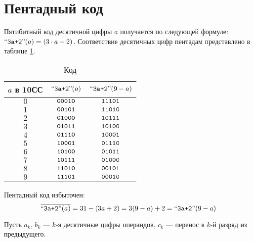 \section{Пентадный код \PentaLabel}

Пятибитный код десятичной цифры $a$ получается по следующей формуле: $\text{``\texttt{3a+2}''}(a)=(3\cdot a + 2)$. Соответствие десятичных цифр пентадам представлено в таблице \ref{t:bcd:Penta}. 
    
\begin{table}[!ht]
    \caption{Код \PentaLabel}
    \label{t:bcd:Penta}
    \centering
    \begin{tabular}{|c|c|c|}
        \hline\hline
        $a$ в 10СС  & $\text{``\texttt{3a+2}''}(a)$       & $\text{``\texttt{3a+2}''}(9-a)$\\
        \hline\hline
        $0$         & $\texttt{00010}$  & $\texttt{11101}$ \\
        $1$         & $\texttt{00101}$  & $\texttt{11010}$ \\
        $2$         & $\texttt{01000}$  & $\texttt{10111}$ \\
        $3$         & $\texttt{01011}$  & $\texttt{10100}$ \\
        $4$         & $\texttt{01110}$  & $\texttt{10001}$ \\
        $5$         & $\texttt{10001}$  & $\texttt{01110}$ \\
        $6$         & $\texttt{10100}$  & $\texttt{01011}$ \\
        $7$         & $\texttt{10111}$  & $\texttt{01000}$ \\
        $8$         & $\texttt{11010}$  & $\texttt{00101}$ \\
        $9$         & $\texttt{11101}$  & $\texttt{00010}$ \\
        \hline
    \end{tabular}
\end{table}

Пентадный код избыточен:    
\[
    \overline{\text{``\texttt{3a+2}''}(a)}=31-(3a+2)=3(9-a)+2=\text{``\texttt{3a+2}''}(9-a)
\]

Пусть $a_k$, $b_k$ --- $k$-я десятичные цифры операндов, $c_k$ --- перенос в $k$-й разряд из предыдущего.
    
